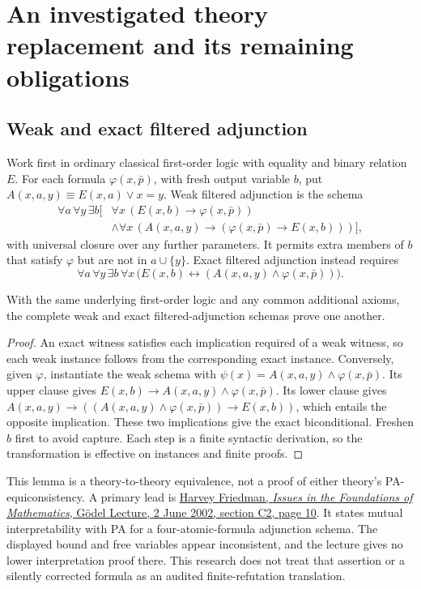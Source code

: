 \section{An investigated theory replacement and its remaining obligations}
\subsection{Weak and exact filtered adjunction}
Work first in ordinary classical first-order logic with equality and binary
relation $E$. For each formula $\varphi(x,\bar p)$, with fresh output variable
$b$, put $A(x,a,y)\equiv E(x,a)\lor x=y$. Weak filtered adjunction is the schema
\begin{align*}
 \forall a\,\forall y\,\exists b\bigl[&
  \forall x\,(E(x,b)\to\varphi(x,\bar p))\\[-2pt]
 &\land\forall x\,(A(x,a,y)\to
              (\varphi(x,\bar p)\to E(x,b)))\bigr],
\end{align*}
with universal closure over any further parameters. It permits extra members
of $b$ that satisfy $\varphi$ but are not in $a\cup\{y\}$. Exact filtered
adjunction instead requires
\[
 \forall a\,\forall y\,\exists b\,\forall x\,
 \bigl(E(x,b)\leftrightarrow(A(x,a,y)\land\varphi(x,\bar p))\bigr).
\]

\begin{lemma}
With the same underlying first-order logic and any common additional axioms,
the complete weak and exact filtered-adjunction schemas prove one another.
\end{lemma}
\begin{proof}
An exact witness satisfies each implication required of a weak witness, so
each weak instance follows from the corresponding exact instance. Conversely,
given $\varphi$, instantiate the weak schema with
$\psi(x)=A(x,a,y)\land\varphi(x,\bar p)$. Its upper clause gives
$E(x,b)\to A(x,a,y)\land\varphi(x,\bar p)$. Its lower clause gives
$A(x,a,y)\to((A(x,a,y)\land\varphi(x,\bar p))\to E(x,b))$, which entails the
opposite implication. These two implications give the exact biconditional.
Freshen $b$ first to avoid capture. Each step is a finite syntactic derivation,
so the transformation is effective on instances and finite proofs.
\end{proof}

This lemma is a theory-to-theory equivalence, not a proof of either theory's
PA-equiconsistency. A primary lead is
\href{https://cpb-us-w2.wpmucdn.com/u.osu.edu/dist/1/1952/files/2014/01/GodelLect060202-n2gdjc.pdf}
{Harvey Friedman, \emph{Issues in the Foundations of Mathematics}, G\"odel
Lecture, 2 June 2002, section C2, page 10}. It states mutual interpretability
with PA for a four-atomic-formula adjunction schema. The displayed bound and
free variables appear inconsistent, and the lecture gives no lower
interpretation proof there. This research does not treat that assertion or a
silently corrected formula as an audited finite-refutation translation.

